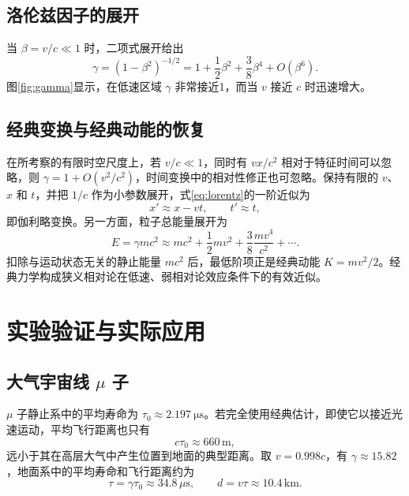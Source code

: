 \documentclass[style=classic,color=full]{lc-article}
\begin{document}
\subsection{洛伦兹因子的展开}

当 $\beta=v/c\ll1$ 时，二项式展开给出
\begin{equation}
  \gamma=(1-\beta^2)^{-1/2}
  =1+\frac{1}{2}\beta^2+\frac{3}{8}\beta^4+O(\beta^6).
  \label{eq:gammaexpansion}
\end{equation}
图\ref{fig:gamma}显示，在低速区域 $\gamma$ 非常接近1，而当 $v$ 接近 $c$ 时迅速增大。


\subsection{经典变换与经典动能的恢复}

在所考察的有限时空尺度上，若 $v/c\ll1$，同时有 $vx/c^2$ 相对于特征时间可以忽略，则 $\gamma=1+O(v^2/c^2)$，时间变换中的相对性修正也可忽略。保持有限的 $v$、$x$ 和 $t$，并把 $1/c$ 作为小参数展开，式\eqref{eq:lorentz}的一阶近似为
\begin{equation}
  x'\approx x-vt,\qquad t'\approx t,
\end{equation}
即伽利略变换。另一方面，粒子总能量展开为
\begin{equation}
  E=\gamma mc^2
  \approx mc^2+\frac{1}{2}mv^2+\frac{3}{8}\frac{mv^4}{c^2}+\cdots.
\end{equation}
扣除与运动状态无关的静止能量 $mc^2$ 后，最低阶项正是经典动能 $K=mv^2/2$。经典力学构成狭义相对论在低速、弱相对论效应条件下的有效近似\cite{zhaokaihua}。

\section{实验验证与实际应用}

\subsection{大气宇宙线 \texorpdfstring{$\mu$}{μ} 子}

$\mu$ 子静止系中的平均寿命为 $\tau_0\approx\SI{2.197}{\micro\second}$\cite{pdg2024}。若完全使用经典估计，即使它以接近光速运动，平均飞行距离也只有
\begin{equation}
  c\tau_0\approx 660\,\mathrm{m},
\end{equation}
远小于其在高层大气中产生位置到地面的典型距离。取 $v=0.998c$，有 $\gamma\approx15.82$，地面系中的平均寿命和飞行距离约为
\begin{equation}
  \tau=\gamma\tau_0\approx34.8\,\mu\mathrm{s},\qquad
  d=v\tau\approx10.4\,\mathrm{km}.
\end{equation}
\end{document}
